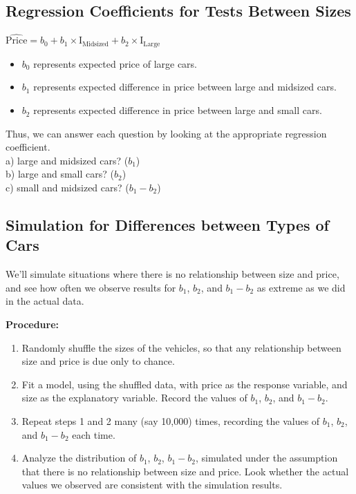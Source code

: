 \documentclass[]{book}
\providecommand{\tightlist}{%
  \setlength{\itemsep}{0pt}\setlength{\parskip}{0pt}}
\begin{document}
\subsection{Regression Coefficients for Tests Between
Sizes}\label{regression-coefficients-for-tests-between-sizes}

\(\widehat{\text{Price}} = b_0 +b_1\times\text{I}_{\text{Midsized}}+ b_2\times\text{I}_{\text{Large}}\)

\begin{itemize}
\tightlist
\item
  \(b_0\) represents expected price of large cars.\\
\item
  \(b_1\) represents expected difference in price between large and
  midsized cars.\\
\item
  \(b_2\) represents expected difference in price between large and
  small cars.
\end{itemize}

Thus, we can answer each question by looking at the appropriate
regression coefficient.\\
a) large and midsized cars? (\(b_1\))\\
b) large and small cars? (\(b_2\))\\
c) small and midsized cars? (\(b_1-b_2\))

\subsection{Simulation for Differences between Types of
Cars}\label{simulation-for-differences-between-types-of-cars}

We'll simulate situations where there is no relationship between size
and price, and see how often we observe results for \(b_1\), \(b_2\),
and \(b_1-b_2\) as extreme as we did in the actual data.

\textbf{Procedure:}

\begin{enumerate}
\def\labelenumi{\arabic{enumi}.}
\item
  Randomly shuffle the sizes of the vehicles, so that any relationship
  between size and price is due only to chance.
\item
  Fit a model, using the shuffled data, with price as the response
  variable, and size as the explanatory variable. Record the values of
  \(b_1\), \(b_2\), and \(b_1-b_2\).
\item
  Repeat steps 1 and 2 many (say 10,000) times, recording the values of
  \(b_1\), \(b_2\), and \(b_1-b_2\) each time.
\item
  Analyze the distribution of \(b_1\), \(b_2\), \(b_1-b_2\), simulated
  under the assumption that there is no relationship between size and
  price. Look whether the actual values we observed are consistent with
  the simulation results.
\end{enumerate}
\end{document}
